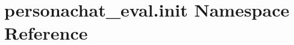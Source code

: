 \hypertarget{namespacepersonachat__eval_1_1init}{}\section{personachat\+\_\+eval.\+init Namespace Reference}
\label{namespacepersonachat__eval_1_1init}

